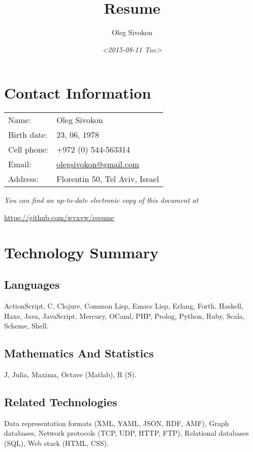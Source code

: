 \documentclass[11pt]{article}
\author{Oleg Sivokon}
\date{\textit{<2015-08-11 Tue>}}
\title{Resume}
\begin{document}
\maketitle

\section{Contact Information}
\label{sec:orgheadline1}
\begin{center}
\begin{tabular}{ll}
Name: & Oleg Sivokon\\
Birth date: & 23, 06, 1978\\
Cell phone: & +972 (0) 544-563314\\
Email: & \href{mailto:olegsivokon@gmail.com}{olegsivokon@gmail.com}\\
Address: & Florentin 50, Tel Aviv, Israel\\
\end{tabular}
\end{center}

\emph{You can find an up-to-date electronic copy of this document at}

\url{https://github.com/wvxvw/resume}

\clearpage

\section{Technology Summary}
\label{sec:orgheadline8}
\subsection{Languages}
\label{sec:orgheadline2}
ActionScript, C, Clojure, Common Lisp, Emacs Lisp, Erlang, Forth, Haskell,
Haxe, Java, JavaScript, Mercury, OCaml, PHP, Prolog, Python, Ruby, Scala,
Scheme, Shell.

\subsection{Mathematics And Statistics}
\label{sec:orgheadline3}
J, Julia, Maxima, Octave (Matlab), R (S).

\subsection{Related Technologies}
\label{sec:orgheadline4}
Data representation formats (XML, YAML, JSON, RDF, AMF), Graph databases,
Network protocols (TCP, UDP, HTTP, FTP), Relational databases (SQL), Web
stack (HTML, CSS).
\end{document}
